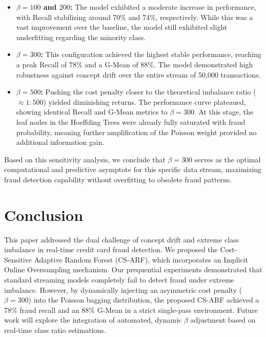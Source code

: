 \begin{itemize}
    \item \textbf{$\beta = 100$ and $200$:} The model exhibited a moderate increase in performance, with Recall stabilizing around 70\% and 74\%, respectively. While this was a vast improvement over the baseline, the model still exhibited slight underfitting regarding the minority class.
    \item \textbf{$\beta = 300$:} This configuration achieved the highest stable performance, reaching a peak Recall of 78\% and a G-Mean of 88\%. The model demonstrated high robustness against concept drift over the entire stream of 50,000 transactions.
    \item \textbf{$\beta = 500$:} Pushing the cost penalty closer to the theoretical imbalance ratio ($\approx 1:500$) yielded diminishing returns. The performance curve plateaued, showing identical Recall and G-Mean metrics to $\beta = 300$. At this stage, the leaf nodes in the Hoeffding Trees were already fully saturated with fraud probability, meaning further amplification of the Poisson weight provided no additional information gain.
\end{itemize}

Based on this sensitivity analysis, we conclude that $\beta = 300$ serves as the optimal computational and predictive asymptote for this specific data stream, maximizing fraud detection capability without overfitting to obsolete fraud patterns.

\section{Conclusion}
\label{sec:conclusion}
This paper addressed the dual challenge of concept drift and extreme class imbalance in real-time credit card fraud detection. We proposed the Cost-Sensitive Adaptive Random Forest (CS-ARF), which incorporates an Implicit Online Oversampling mechanism. Our prequential experiments demonstrated that standard streaming models completely fail to detect fraud under extreme imbalance. However, by dynamically injecting an asymmetric cost penalty ($\beta=300$) into the Poisson bagging distribution, the proposed CS-ARF achieved a 78\% fraud recall and an 88\% G-Mean in a strict single-pass environment. Future work will explore the integration of automated, dynamic $\beta$ adjustment based on real-time class ratio estimations.
